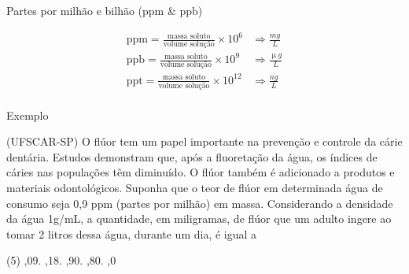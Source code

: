 \documentclass[presentation,professionalfonts,aspectratio=169]{beamer}
\begin{document}
\begin{frame}[label={sec:org5a2482e}]{Partes por milhão e bilhão (ppm \& ppb)}



\begin{align*}
\text{ppm}=\frac{\text{massa soluto}}{\text{volume solução}} \times 10^6 & \Rightarrow  \frac{mg}{L}\\
\text{ppb}=\frac{\text{massa soluto}}{\text{volume solução}} \times 10^9 & \Rightarrow  \frac{\upmu g}{L}\\
\text{ppt}=\frac{\text{massa soluto}}{\text{volume solução}} \times 10^{12} & \Rightarrow  \frac{ng}{L}\\
\end{align*}
\end{frame}



\begin{frame}[label={sec:org761dc1a}]{Exemplo}
\begin{question}
\alert{(UFSCAR-SP)} O flúor tem um papel importante na prevenção e controle da cárie dentária. Estudos demonstram que, após a fluoretação da água, os índices de cáries nas populações têm diminuído. O flúor também é adicionado a produtos e materiais odontológicos. Suponha que o teor de flúor em determinada água de consumo seja 0,9 ppm (partes por milhão) em massa. Considerando a densidade da água 1g/mL, a quantidade, em miligramas, de flúor que um adulto ingere ao tomar 2 litros dessa água, durante um dia, é igual a

\begin{choice}(5)
,09.
,18.
,90.
,80.
,0
\end{choice}
\end{question}
\end{frame}
\end{document}

